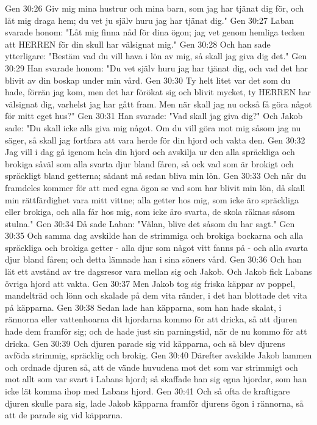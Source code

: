 Gen 30:26  Giv mig mina hustrur och mina barn, som jag har tjänat dig för, och låt mig draga hem; du vet ju själv huru jag har tjänat dig."
Gen 30:27  Laban svarade honom: "Låt mig finna nåd för dina ögon; jag vet genom hemliga tecken att HERREN för din skull har välsignat mig."
Gen 30:28  Och han sade ytterligare: "Bestäm vad du vill hava i lön av mig, så skall jag giva dig det."
Gen 30:29  Han svarade honom: "Du vet själv huru jag har tjänat dig, och vad det har blivit av din boskap under min vård.
Gen 30:30  Ty helt litet var det som du hade, förrän jag kom, men det har förökat sig och blivit mycket, ty HERREN har välsignat dig, varhelst jag har gått fram. Men när skall jag nu också få göra något för mitt eget hus?"
Gen 30:31  Han svarade: "Vad skall jag giva dig?" Och Jakob sade: "Du skall icke alls giva mig något. Om du vill göra mot mig såsom jag nu säger, så skall jag fortfara att vara herde för din hjord och vakta den.
Gen 30:32  Jag vill i dag gå igenom hela din hjord och avskilja ur den alla spräckliga och brokiga såväl som alla svarta djur bland fåren, så ock vad som är brokigt och spräckligt bland getterna; sådant må sedan bliva min lön.
Gen 30:33  Och när du framdeles kommer för att med egna ögon se vad som har blivit min lön, då skall min rättfärdighet vara mitt vittne; alla getter hos mig, som icke äro spräckliga eller brokiga, och alla får hos mig, som icke äro svarta, de skola räknas såsom stulna."
Gen 30:34  Då sade Laban: "Välan, blive det såsom du har sagt."
Gen 30:35  Och samma dag avskilde han de strimmiga och brokiga bockarna och alla spräckliga och brokiga getter - alla djur som något vitt fanns på - och alla svarta djur bland fåren; och detta lämnade han i sina söners vård.
Gen 30:36  Och han lät ett avstånd av tre dagsresor vara mellan sig och Jakob. Och Jakob fick Labans övriga hjord att vakta.
Gen 30:37  Men Jakob tog sig friska käppar av poppel, mandelträd och lönn och skalade på dem vita ränder, i det han blottade det vita på käpparna.
Gen 30:38  Sedan lade han käpparna, som han hade skalat, i rännorna eller vattenhoarna dit hjordarna kommo för att dricka, så att djuren hade dem framför sig; och de hade just sin parningstid, när de nu kommo för att dricka.
Gen 30:39  Och djuren parade sig vid käpparna, och så blev djurens avföda strimmig, spräcklig och brokig.
Gen 30:40  Därefter avskilde Jakob lammen och ordnade djuren så, att de vände huvudena mot det som var strimmigt och mot allt som var svart i Labans hjord; så skaffade han sig egna hjordar, som han icke lät komma ihop med Labans hjord.
Gen 30:41  Och så ofta de kraftigare djuren skulle para sig, lade Jakob käpparna framför djurens ögon i rännorna, så att de parade sig vid käpparna.
